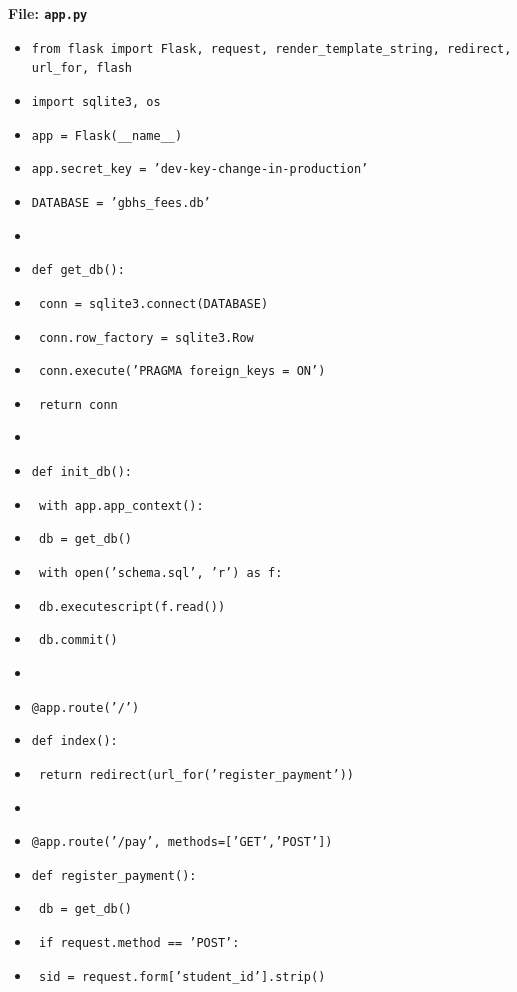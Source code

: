 \documentclass[11pt]{article}
\begin{document}
\begin{methode}
\textbf{File: \texttt{app.py}}
\begin{itemize}
    \item \texttt{from flask import Flask, request, render\_template\_string, redirect, url\_for, flash}
    \item \texttt{import sqlite3, os}
    \item \texttt{app = Flask(\_\_name\_\_)}
    \item \texttt{app.secret\_key = 'dev-key-change-in-production'}
    \item \texttt{DATABASE = 'gbhs\_fees.db'}
    \item \texttt{}
    \item \texttt{def get\_db():}
    \item \texttt{    conn = sqlite3.connect(DATABASE)}
    \item \texttt{    conn.row\_factory = sqlite3.Row}
    \item \texttt{    conn.execute('PRAGMA foreign\_keys = ON')}
    \item \texttt{    return conn}
    \item \texttt{}
    \item \texttt{def init\_db():}
    \item \texttt{    with app.app\_context():}
    \item \texttt{        db = get\_db()}
    \item \texttt{        with open('schema.sql', 'r') as f:}
    \item \texttt{            db.executescript(f.read())}
    \item \texttt{        db.commit()}
    \item \texttt{}
    \item \texttt{@app.route('/')}
    \item \texttt{def index():}
    \item \texttt{    return redirect(url\_for('register\_payment'))}
    \item \texttt{}
    \item \texttt{@app.route('/pay', methods=['GET','POST'])}
    \item \texttt{def register\_payment():}
    \item \texttt{    db = get\_db()}
    \item \texttt{    if request.method == 'POST':}
    \item \texttt{        sid = request.form['student\_id'].strip()}

\end{itemize}
\end{methode}
\end{document}
